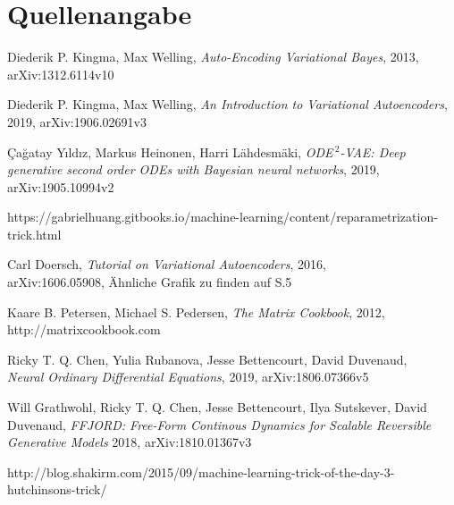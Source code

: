\documentclass[12pt]{article}
\begin{document}
	\section[Quellenangabe]{Quellenangabe}
	\begin{thebibliography}{9}
		Diederik P. Kingma, Max Welling,
		\textit{Auto-Encoding Variational Bayes},
		2013,\\
		arXiv:1312.6114v10

		Diederik P. Kingma, Max Welling,
		\textit{An Introduction to Variational Autoencoders},
		2019,
		arXiv:1906.02691v3

		Çağatay Yıldız, Markus Heinonen, Harri Lähdesmäki,
		\textit{ODE$^{\ 2}$-VAE: Deep generative second order ODEs with Bayesian neural networks},
		2019,
		arXiv:1905.10994v2

		https://gabrielhuang.gitbooks.io/machine-learning/content/reparametrization-trick.html

		Carl Doersch,
		\textit{Tutorial on Variational Autoencoders},
		2016,\\
		arXiv:1606.05908,
		Ähnliche Grafik zu finden auf S.5

		Kaare B. Petersen, Michael S. Pedersen,
		\textit{The Matrix Cookbook},
		2012,
		http://matrixcookbook.com%

		Ricky T. Q. Chen, Yulia Rubanova, Jesse Bettencourt, David Duvenaud,\\
		\textit{Neural Ordinary Differential Equations},
		2019, arXiv:1806.07366v5

		Will Grathwohl, Ricky T. Q. Chen, Jesse Bettencourt, Ilya Sutskever, David Duvenaud,
		\textit{FFJORD:  Free-Form Continous Dynamics for Scalable Reversible Generative Models}
		2018, arXiv:1810.01367v3

		http://blog.shakirm.com/2015/09/machine-learning-trick-of-the-day-3-hutchinsons-trick/

	\end{thebibliography}
\end{document}
